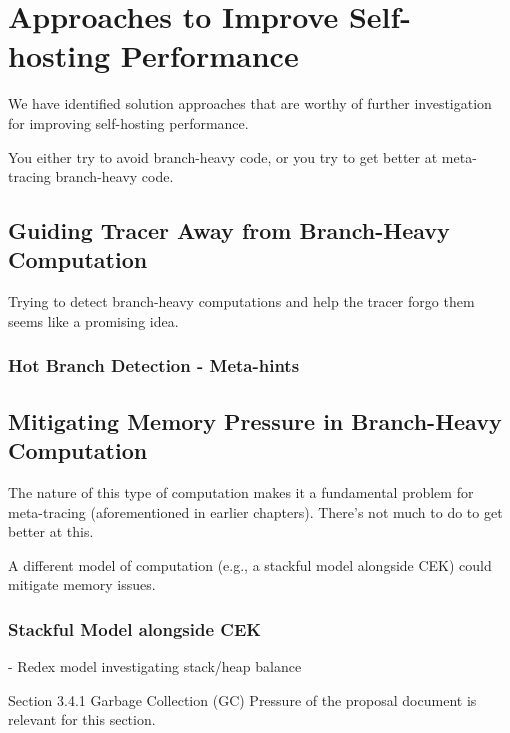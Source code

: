 \chapter{Approaches to Improve Self-hosting Performance}

	\label{chapter:solution}

	\begin{chaptersynopsis}
		We have identified solution approaches that are worthy of further investigation for improving self-hosting performance.

		You either try to avoid branch-heavy code, or you try to get better at meta-tracing branch-heavy code.
	\end{chaptersynopsis}

	\section{Guiding Tracer Away from Branch-Heavy Computation}
		\begin{mainpoint}
			Trying to detect branch-heavy computations and help the tracer forgo them seems like a promising idea.

		\end{mainpoint}
		\subsection{Hot Branch Detection - Meta-hints}


	\section{Mitigating Memory Pressure in Branch-Heavy Computation}
		\begin{mainpoint}
			The nature of this type of computation makes it a fundamental problem for meta-tracing (aforementioned in earlier chapters). There's not much to do to get better at this.

			A different model of computation (e.g., a stackful model alongside CEK) could mitigate memory issues.
		\end{mainpoint}

		\subsection{Stackful Model alongside CEK}
		- Redex model investigating stack/heap balance

		\begin{todo}[Import]
			Section 3.4.1 Garbage Collection (GC) Pressure of the proposal document is relevant for this section.
		\end{todo}
